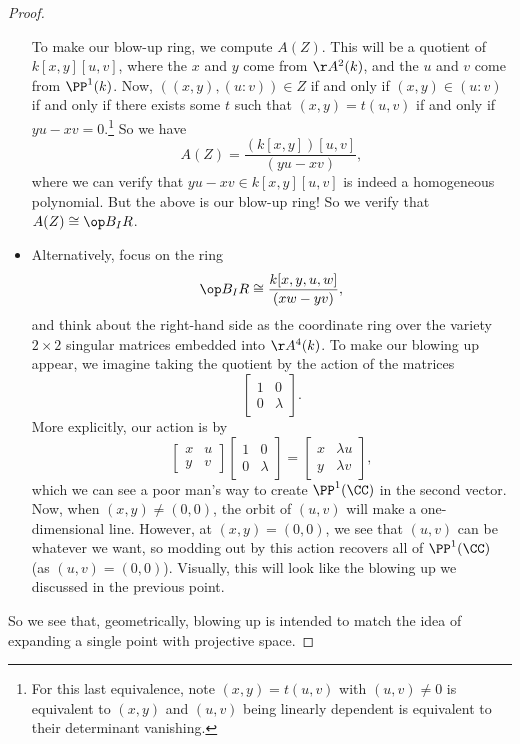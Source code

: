 \begin{proof}
\begin{itemize}
		To make our blow-up ring, we compute $A(Z)$. This will be a quotient of $k[x,y][u,v]$, where the $x$ and $y$ come from $\AA^2(k)$, and the $u$ and $v$ come from $\PP^1(k)$. Now, $((x,y),(u:v))\in Z$ if and only if $(x,y)\in(u:v)$ if and only if there exists some $t$ such that $(x,y)=t(u,v)$ if and only if $yu-xv=0$.\footnote{For this last equivalence, note $(x,y)=t(u,v)$ with $(u,v)\ne0$ is equivalent to $(x,y)$ and $(u,v)$ being linearly dependent is equivalent to their determinant vanishing.} So we have
		\[A(Z)=\frac{(k[x,y])[u,v]}{(yu-xv)},\]
		where we can verify that $yu-xv\in k[x,y][u,v]$ is indeed a homogeneous polynomial. But the above is our blow-up ring! So we verify that $A(Z)\cong\op B_IR$.
		\item Alternatively, focus on the ring
		\[\op B_IR\cong\frac{k[x,y,u,w]}{(xw-yv)},\]
		and think about the right-hand side as the coordinate ring over the variety $2\times2$ singular matrices embedded into $\AA^4(k)$. To make our blowing up appear, we imagine taking the quotient by the action of the matrices
		\[\begin{bmatrix}
			1 & 0 \\
			0 & \lambda
		\end{bmatrix}.\]
		More explicitly, our action is by
		\[\begin{bmatrix}
			x & u \\
			y & v
		\end{bmatrix}\begin{bmatrix}
			1 & 0 \\
			0 & \lambda
		\end{bmatrix}=\begin{bmatrix}
			x & \lambda u \\
			y & \lambda v
		\end{bmatrix},\]
		which we can see a poor man's way to create $\PP^1(\CC)$ in the second vector. Now, when $(x,y)\ne(0,0)$, the orbit of $(u,v)$ will make a one-dimensional line. However, at $(x,y)=(0,0)$, we see that $(u,v)$ can be whatever we want, so modding out by this action recovers all of $\PP^1(\CC)$ (as $(u,v)=(0,0)$). Visually, this will look like the blowing up we discussed in the previous point.
	\end{itemize}
	So we see that, geometrically, blowing up is intended to match the idea of expanding a single point with projective space.
\end{proof}

